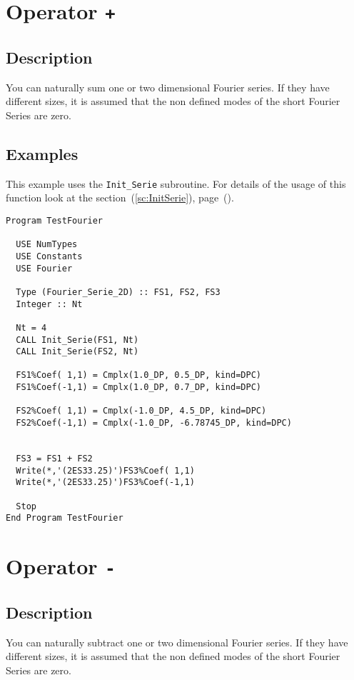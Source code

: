 \section{Operator \texttt{+}}

\subsection{Description}

You can naturally sum one or two dimensional Fourier series. If they
have different sizes, it is assumed that the non defined modes of the
short Fourier Series are zero.

\subsection{Examples}

This example uses the \texttt{Init\_Serie} subroutine. For details of
the usage of this function look at the section~(\ref{sc:InitSerie}),
page~(\pageref{sc:InitSerie}). 

\begin{verbatim}
Program TestFourier

  USE NumTypes
  USE Constants
  USE Fourier

  Type (Fourier_Serie_2D) :: FS1, FS2, FS3
  Integer :: Nt

  Nt = 4
  CALL Init_Serie(FS1, Nt)
  CALL Init_Serie(FS2, Nt)

  FS1%Coef( 1,1) = Cmplx(1.0_DP, 0.5_DP, kind=DPC)
  FS1%Coef(-1,1) = Cmplx(1.0_DP, 0.7_DP, kind=DPC)
  
  FS2%Coef( 1,1) = Cmplx(-1.0_DP, 4.5_DP, kind=DPC)
  FS2%Coef(-1,1) = Cmplx(-1.0_DP, -6.78745_DP, kind=DPC)
  

  FS3 = FS1 + FS2
  Write(*,'(2ES33.25)')FS3%Coef( 1,1)
  Write(*,'(2ES33.25)')FS3%Coef(-1,1)

  Stop
End Program TestFourier
\end{verbatim}

\section{Operator \texttt{-}}

\subsection{Description}

You can naturally subtract one or two dimensional Fourier series. If they
have different sizes, it is assumed that the non defined modes of the
short Fourier Series are zero.

